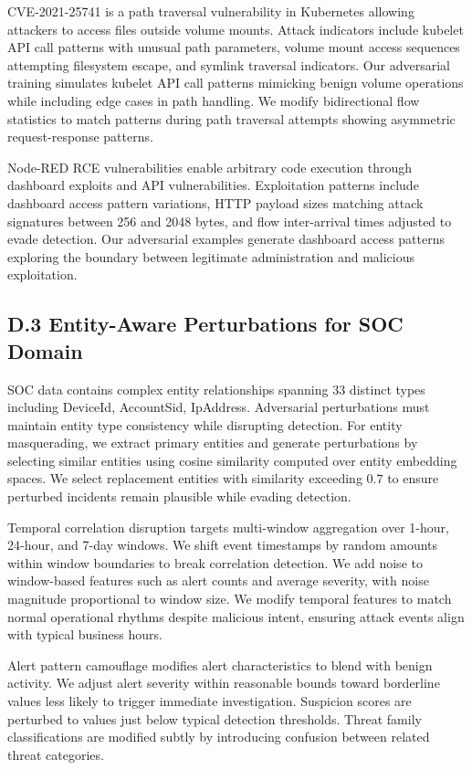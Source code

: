 \documentclass[12pt,a4paper]{article}
\theoremstyle{definition}
\begin{document}
CVE-2021-25741 is a path traversal vulnerability in Kubernetes allowing attackers to access files outside volume mounts. Attack indicators include kubelet API call patterns with unusual path parameters, volume mount access sequences attempting filesystem escape, and symlink traversal indicators. Our adversarial training simulates kubelet API call patterns mimicking benign volume operations while including edge cases in path handling. We modify bidirectional flow statistics to match patterns during path traversal attempts showing asymmetric request-response patterns.

Node-RED RCE vulnerabilities enable arbitrary code execution through dashboard exploits and API vulnerabilities. Exploitation patterns include dashboard access pattern variations, HTTP payload sizes matching attack signatures between 256 and 2048 bytes, and flow inter-arrival times adjusted to evade detection. Our adversarial examples generate dashboard access patterns exploring the boundary between legitimate administration and malicious exploitation.

\subsection{D.3 Entity-Aware Perturbations for SOC Domain}

SOC data contains complex entity relationships spanning 33 distinct types including DeviceId, AccountSid, IpAddress. Adversarial perturbations must maintain entity type consistency while disrupting detection. For entity masquerading, we extract primary entities and generate perturbations by selecting similar entities using cosine similarity computed over entity embedding spaces. We select replacement entities with similarity exceeding $0.7$ to ensure perturbed incidents remain plausible while evading detection.

Temporal correlation disruption targets multi-window aggregation over 1-hour, 24-hour, and 7-day windows. We shift event timestamps by random amounts within window boundaries to break correlation detection. We add noise to window-based features such as alert counts and average severity, with noise magnitude proportional to window size. We modify temporal features to match normal operational rhythms despite malicious intent, ensuring attack events align with typical business hours.

Alert pattern camouflage modifies alert characteristics to blend with benign activity. We adjust alert severity within reasonable bounds toward borderline values less likely to trigger immediate investigation. Suspicion scores are perturbed to values just below typical detection thresholds. Threat family classifications are modified subtly by introducing confusion between related threat categories.
\end{document}
